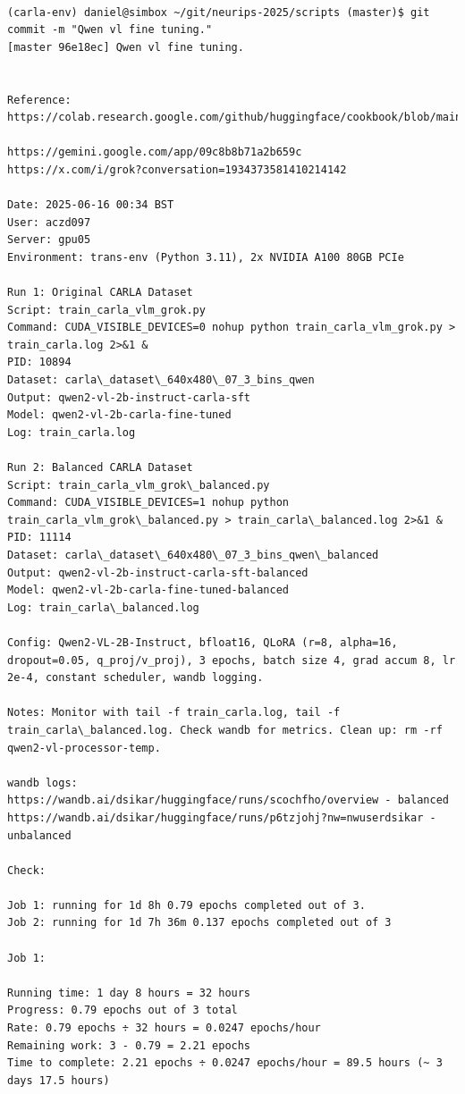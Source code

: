 \begin{verbatim}

(carla-env) daniel@simbox ~/git/neurips-2025/scripts (master)$ git commit -m "Qwen vl fine tuning."
[master 96e18ec] Qwen vl fine tuning.


Reference:
https://colab.research.google.com/github/huggingface/cookbook/blob/main/notebooks/en/fine_tuning_vlm_trl.ipynb#scrollTo=gpLfsCUtUW6I

https://gemini.google.com/app/09c8b8b71a2b659c
https://x.com/i/grok?conversation=1934373581410214142

Date: 2025-06-16 00:34 BST
User: aczd097
Server: gpu05
Environment: trans-env (Python 3.11), 2x NVIDIA A100 80GB PCIe

Run 1: Original CARLA Dataset
Script: train_carla_vlm_grok.py
Command: CUDA_VISIBLE_DEVICES=0 nohup python train_carla_vlm_grok.py > train_carla.log 2>&1 &
PID: 10894
Dataset: carla\_dataset\_640x480\_07_3_bins_qwen
Output: qwen2-vl-2b-instruct-carla-sft
Model: qwen2-vl-2b-carla-fine-tuned
Log: train_carla.log

Run 2: Balanced CARLA Dataset
Script: train_carla_vlm_grok\_balanced.py
Command: CUDA_VISIBLE_DEVICES=1 nohup python train_carla_vlm_grok\_balanced.py > train_carla\_balanced.log 2>&1 &
PID: 11114
Dataset: carla\_dataset\_640x480\_07_3_bins_qwen\_balanced
Output: qwen2-vl-2b-instruct-carla-sft-balanced
Model: qwen2-vl-2b-carla-fine-tuned-balanced
Log: train_carla\_balanced.log

Config: Qwen2-VL-2B-Instruct, bfloat16, QLoRA (r=8, alpha=16, dropout=0.05, q_proj/v_proj), 3 epochs, batch size 4, grad accum 8, lr 2e-4, constant scheduler, wandb logging.

Notes: Monitor with tail -f train_carla.log, tail -f train_carla\_balanced.log. Check wandb for metrics. Clean up: rm -rf qwen2-vl-processor-temp.

wandb logs:
https://wandb.ai/dsikar/huggingface/runs/scochfho/overview - balanced 
https://wandb.ai/dsikar/huggingface/runs/p6tzjohj?nw=nwuserdsikar - unbalanced

Check:

Job 1: running for 1d 8h 0.79 epochs completed out of 3.
Job 2: running for 1d 7h 36m 0.137 epochs completed out of 3

Job 1:

Running time: 1 day 8 hours = 32 hours
Progress: 0.79 epochs out of 3 total
Rate: 0.79 epochs ÷ 32 hours = 0.0247 epochs/hour
Remaining work: 3 - 0.79 = 2.21 epochs
Time to complete: 2.21 epochs ÷ 0.0247 epochs/hour = 89.5 hours (~ 3 days 17.5 hours)


\end{verbatim}
